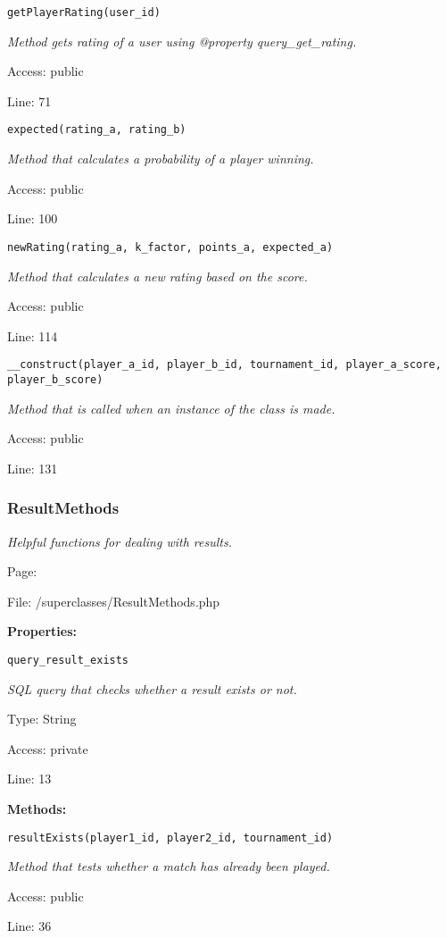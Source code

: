 \texttt{getPlayerRating(user\_id)}

{\scriptsize
\textit{Method gets rating of a user using @property query\_get\_rating.}

Access: public

Line: 71

}

\texttt{expected(rating\_a, rating\_b)}

{\scriptsize
\textit{Method that calculates a probability of a player winning.}

Access: public

Line: 100

}

\texttt{newRating(rating\_a, k\_factor, points\_a, expected\_a)}

{\scriptsize
\textit{Method that calculates a new rating based on the score.}

Access: public

Line: 114

}

\texttt{\_\_construct(player\_a\_id, player\_b\_id, tournament\_id, player\_a\_score, player\_b\_score)}

{\scriptsize
\textit{Method that is called when an instance of the class is made.}

Access: public

Line: 131

}

\subsubsection{ResultMethods}\label{ResultMethods.php.doc}
\textit{Helpful functions for dealing with results.}

Page: \pageref{ResultMethods.php}

File: /superclasses/ResultMethods.php

\textbf{Properties:}

\texttt{query\_result\_exists}

{\scriptsize
\textit{SQL query that checks whether a result exists or not.}

Type: String

Access: private

Line: 13

}
\textbf{Methods:}

\texttt{resultExists(player1\_id, player2\_id, tournament\_id)}

{\scriptsize
\textit{Method that tests whether a match has already been played.}

Access: public

Line: 36

}

